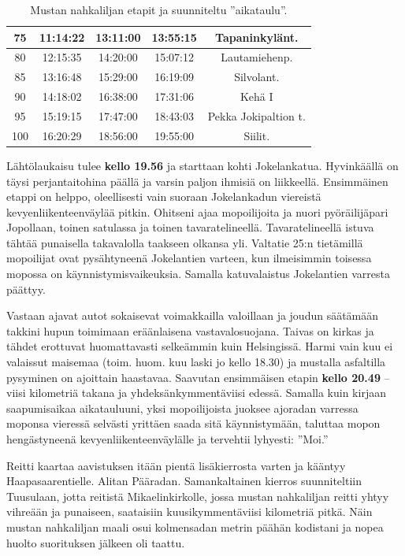 \begin{multicols}{2}
\begin{table}[t]
\begin{tabular}{|c|ccc|c|}
75 & \multicolumn{1}{c|}{11:14:22} & \multicolumn{1}{c|}{13:11:00} & 13:55:15 & Tapaninkylänt. \\ \hline
80 & \multicolumn{1}{c|}{12:15:35} & \multicolumn{1}{c|}{14:20:00} & 15:07:12 & Lautamiehenp. \\ \hline
85 & \multicolumn{1}{c|}{13:16:48} & \multicolumn{1}{c|}{15:29:00} & 16:19:09 & Silvolant. \\ \hline
90 & \multicolumn{1}{c|}{14:18:02} & \multicolumn{1}{c|}{16:38:00} & 17:31:06 & Kehä I \\ \hline
95 & \multicolumn{1}{c|}{15:19:15} & \multicolumn{1}{c|}{17:47:00} & 18:43:03 & Pekka Jokipaltion t. \\ \hline
100 & \multicolumn{1}{c|}{16:20:29} & \multicolumn{1}{c|}{18:56:00} & 19:55:00 & Siilit. \\ \hline
\end{tabular}
\caption{Mustan nahkaliljan etapit ja suunniteltu ''aikataulu''.}
\end{table}

Lähtölaukaisu tulee \textbf{kello 19.56} ja starttaan kohti Jokelankatua. 
Hyvinkäällä on täysi perjantaitohina päällä ja varsin paljon ihmisiä on 
liikkeellä. Ensimmäinen etappi on helppo, oleellisesti vain suoraan 
Jokelankadun viereistä kevyenliikenteenväylää pitkin. Ohitseni ajaa 
mopoilijoita ja nuori pyöräilijäpari Jopollaan, toinen satulassa ja toinen 
tavaratelineellä. Tavaratelineellä istuva tähtää punaisella takavalolla 
taakseen olkansa yli. Valtatie 25:n tietämillä mopoilijat ovat pysähtyneenä 
Jokelantien varteen, kun ilmeisimmin toisessa mopossa on 
käynnistymisvaikeuksia. Samalla katuvalaistus Jokelantien varresta päättyy.

Vastaan ajavat autot sokaisevat voimakkailla valoillaan ja joudun 
säätämään takkini hupun toimimaan eräänlaisena vastavalosuojana. Taivas 
on kirkas ja tähdet erottuvat huomattavasti selkeämmin kuin Helsingissä. 
Harmi vain kuu ei valaissut maisemaa (toim. huom. kuu laski jo kello 18.30) ja 
mustalla asfaltilla pysyminen on ajoittain haastavaa. Saavutan ensimmäisen 
etapin \textbf{kello 20.49} -- viisi kilometriä takana ja 
yhdeksänkymmentäviisi edessä. Samalla kuin kirjaan saapumisaikaa 
aikatauluuni, yksi mopoilijoista juoksee ajoradan varressa moponsa vieressä 
selvästi yrittäen saada sitä käynnistymään, taluttaa mopon 
hengästyneenä kevyenliikenteenväylälle ja tervehtii lyhyesti: ''Moi.''

Reitti kaartaa aavistuksen itään pientä lisäkierrosta varten ja kääntyy 
Haapasaarentielle. Alitan Pääradan. Samankaltainen kierros suunniteltiin 
Tuusulaan, jotta reitistä Mikaelinkirkolle, jossa mustan nahkaliljan reitti 
yhtyy vihreään ja punaiseen, saataisiin kuusikymmentäviisi kilometriä 
pitkä. Näin mustan nahkaliljan maali osui kolmensadan metrin päähän 
kodistani ja nopea huolto suorituksen jälkeen oli taattu.


\end{multicols}

